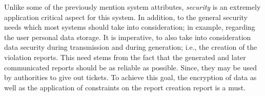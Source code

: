 Unlike some of the previously mention system attributes, \emph{security} is an extremely application critical aspect for this system. In addition, to the general security needs which most systems should take into consideration; in example, regarding the user personal data storage. It is imperative, to also take into consideration data security during transmission and during generation; i.e., the creation of the violation reports. This need stems from the fact that the generated and later communicated reports should be as reliable as possible. Since, they may be used by authorities to give out tickets. To achieve this goal, the encryption of data as well as the application of constraints on the report creation report is a must.